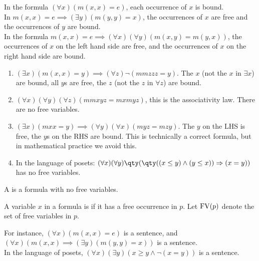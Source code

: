 \begin{example}
    In the formula $(\forall x)(m(x,x) = e)$, each occurrence of $x$ is bound. \\
    In $m(x,x) = e \implies (\exists y)(m(y,y) = x)$, the occurrences of $x$ are free and the occurrences of $y$ are bound. \\
    In the formula $m(x,x) = e \implies (\forall x)(\forall y)(m(x,y) = m(y,x))$, the occurrences of $x$ on the left hand side are free, and the occurrences of $x$ on the right hand side are bound.

    \begin{enumerate}
        \item $(\exists x) (m(x, x) = y) \implies (\forall z) \neg (mmzzz = y)$. The $x$ (not the $x$ in $\exists x$) are bound, all $y$s are free, the $z$ (not the $z$ in $\forall z$) are bound.
        \item $(\forall x) (\forall y) (\forall z) (mm xyz = mx myz)$, this is the associativity law. There are no free variables.
        \item $(\exists x)(m xx = y) \implies (\forall y) (\forall x) (m yz = m zy)$. The $y$ on the LHS is free, the $y$s on the RHS are bound.
        This is technically a correct formula, but in mathematical practice we avoid this.
        \item In the language of posets: $(\forall x) (\forall y) \qty(\qty((x \leq y) \wedge (y \leq x)) \implies (x = y))$ has no free variables.
    \end{enumerate}
\end{example}

\begin{definition}[Sentence]
    A  is a formula with no free variables.
\end{definition}

\begin{definition}[Free]
    A variable $x$ in a formula is  if it has a free occurrence in $p$.
    Let $\operatorname{FV}(p)$ denote the set of free variables in $p$.
\end{definition}

\begin{example}
    For instance, $(\forall x)(m(x,x) = e)$ is a sentence, and $(\forall x)(m(x,x) \implies (\exists y)(m(y,y) = x))$ is a sentence. \\
    In the language of posets, $(\forall x)(\exists y)(x \geq y \wedge \neg(x = y))$ is a sentence.
\end{example}

